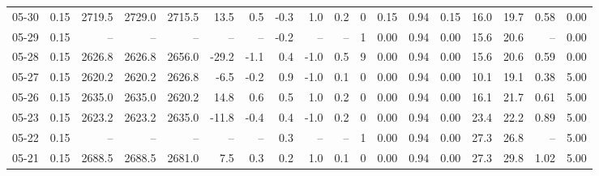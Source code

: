 \begin{threeparttable}
{\begin{tabular}{lrrrrrrrrrrrrrrrrr}
  05-30 &     0.15 & 2719.5 & 2729.0 & 2715.5 &       13.5 &            0.5 &                      -0.3 &                      1.0 &                 0.2 &              0 &       0.15 &      0.94 &           0.15 &             16.0 &                19.7 &            0.58 &                   0.00 \\
  05-29 &     0.15 &     -- &     -- &     -- &         -- &             -- &                      -0.2 &                       -- &                  -- &              1 &       0.00 &      0.94 &           0.00 &             15.6 &                20.6 &              -- &                   0.00 \\
  05-28 &     0.15 & 2626.8 & 2626.8 & 2656.0 &      -29.2 &           -1.1 &                       0.4 &                     -1.0 &                 0.5 &              9 &       0.00 &      0.94 &           0.00 &             15.6 &                20.6 &            0.59 &                   0.00 \\
  05-27 &     0.15 & 2620.2 & 2620.2 & 2626.8 &       -6.5 &           -0.2 &                       0.9 &                     -1.0 &                 0.1 &              0 &       0.00 &      0.94 &           0.00 &             10.1 &                19.1 &            0.38 &                   5.00 \\
  05-26 &     0.15 & 2635.0 & 2635.0 & 2620.2 &       14.8 &            0.6 &                       0.5 &                      1.0 &                 0.2 &              0 &       0.00 &      0.94 &           0.00 &             16.1 &                21.7 &            0.61 &                   5.00 \\
  05-23 &     0.15 & 2623.2 & 2623.2 & 2635.0 &      -11.8 &           -0.4 &                       0.4 &                     -1.0 &                 0.2 &              0 &       0.00 &      0.94 &           0.00 &             23.4 &                22.2 &            0.89 &                   5.00 \\
  05-22 &     0.15 &     -- &     -- &     -- &         -- &             -- &                       0.3 &                       -- &                  -- &              1 &       0.00 &      0.94 &           0.00 &             27.3 &                26.8 &              -- &                   5.00 \\
  05-21 &     0.15 & 2688.5 & 2688.5 & 2681.0 &        7.5 &            0.3 &                       0.2 &                      1.0 &                 0.1 &              0 &       0.00 &      0.94 &           0.00 &             27.3 &                29.8 &            1.02 &                   5.00 \\

\end{tabular}}
\end{threeparttable}
